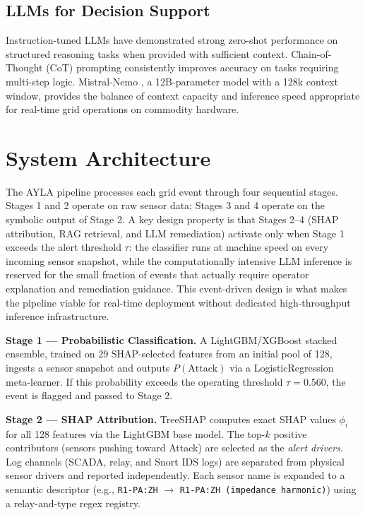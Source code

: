 \documentclass[twocolumn, 10pt, letterpaper]{article}
\begin{document}
\subsection{LLMs for Decision Support}

Instruction-tuned LLMs have demonstrated strong zero-shot performance on
structured reasoning tasks when provided with sufficient context.
Chain-of-Thought (CoT) prompting \cite{wei2022cot} consistently improves
accuracy on tasks requiring multi-step logic.
Mistral-Nemo \cite{mistral2023}, a 12B-parameter model with a 128k context window,
provides the balance of context capacity and inference speed appropriate for
real-time grid operations on commodity hardware.

\section{System Architecture}
\label{sec:system}

The AYLA pipeline processes each grid event through four sequential stages.
Stages 1 and 2 operate on raw sensor data; Stages 3 and 4 operate on the symbolic
output of Stage 2.
A key design property is that Stages 2--4 (SHAP attribution, RAG retrieval, and
LLM remediation) activate only when Stage 1 exceeds the alert threshold $\tau$:
the classifier runs at machine speed on every incoming sensor snapshot, while the
computationally intensive LLM inference is reserved for the small fraction of
events that actually require operator explanation and remediation guidance.
This event-driven design is what makes the pipeline viable for real-time deployment
without dedicated high-throughput inference infrastructure.

\medskip
\noindent
\textbf{Stage 1 --- Probabilistic Classification.}
A LightGBM/XGBoost stacked ensemble, trained on 29 SHAP-selected features from an
initial pool of 128, ingests a sensor snapshot and outputs $P(\text{Attack})$ via a
LogisticRegression meta-learner.
If this probability exceeds the operating threshold $\tau = 0.560$, the event is
flagged and passed to Stage 2.

\medskip
\noindent
\textbf{Stage 2 --- SHAP Attribution.}
TreeSHAP computes exact SHAP values $\phi_i$ for all 128 features via the
LightGBM base model.
The top-$k$ positive contributors (sensors pushing toward Attack) are selected as the
\textit{alert drivers}.
Log channels (SCADA, relay, and Snort IDS logs) are separated from physical sensor
drivers and reported independently.
Each sensor name is expanded to a semantic descriptor
(e.g., \texttt{R1-PA:ZH} $\rightarrow$ \texttt{R1-PA:ZH (impedance harmonic)})
using a relay-and-type regex registry.
\end{document}
